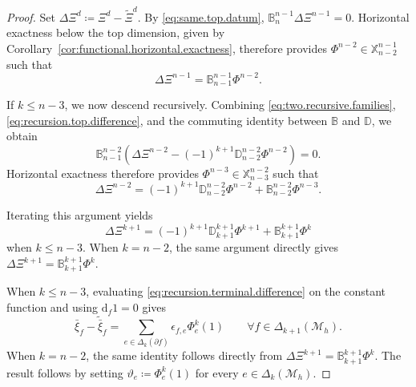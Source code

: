 \documentclass[a4paper,11pt]{article}
\theoremstyle{definition}
\newcommand{\DIFF}{\mathrm{d}}
\newcommand{\Mh}{\mathcal{M}_h}
\newcommand{\FM}[1]{\Delta_{#1}}
\begin{document}
\begin{proof}
Set $\Delta\Xi^d\coloneqq\Xi^d-\widetilde\Xi^d$.
By \eqref{eq:same.top.datum}, $\mathbb B_n^{n-1}\Delta\Xi^{n-1}=0$.
Horizontal exactness below the top dimension, given by Corollary~\ref{cor:functional.horizontal.exactness}, therefore provides $\Phi^{n-2} \in \mathbb X_{n-2}^{n-1}$ such that
\begin{equation}\label{eq:recursion.top.difference}
  \Delta\Xi^{n-1}
  =
  \mathbb B_{n-1}^{n-1}\Phi^{n-2}.
\end{equation}

If $k\leq n-3$, we now descend recursively.
Combining \eqref{eq:two.recursive.families}, \eqref{eq:recursion.top.difference}, and the commuting identity between $\mathbb B$ and $\mathbb D$, we obtain
\[
  \mathbb B_{n-1}^{n-2}
  \left(
    \Delta\Xi^{n-2}
    -
    (-1)^{k+1}
    \mathbb D_{n-2}^{n-2}\Phi^{n-2}
  \right)
  =
  0.
\]
Horizontal exactness therefore provides $\Phi^{n-3}\in\mathbb X_{n-3}^{n-2}$ such that
\[
  \Delta\Xi^{n-2}
  =
  (-1)^{k+1}\mathbb D_{n-2}^{n-2}\Phi^{n-2}
  +
  \mathbb B_{n-2}^{n-2}\Phi^{n-3}.
\]

Iterating this argument yields
\begin{equation}\label{eq:recursion.terminal.difference}
  \Delta\Xi^{k+1}
  =
  (-1)^{k+1}
  \mathbb D_{k+1}^{k+1}\Phi^{k+1}
  +
  \mathbb B_{k+1}^{k+1}\Phi^k
\end{equation}
when $k\leq n-3$.
When $k=n-2$, the same argument directly gives $\Delta\Xi^{k+1}=\mathbb B_{k+1}^{k+1}\Phi^k$.

When $k\leq n-3$, evaluating \eqref{eq:recursion.terminal.difference} on the constant function and using $\DIFF_f1=0$ gives
\[
  \bar\xi_f-\widetilde{\bar\xi}_f
  =
  \sum_{e\in\FM{k}(\partial f)}
  \epsilon_{f,e}\Phi_e^k(1)
  \qquad
  \forall f\in\FM{k+1}(\Mh).
\]
When $k=n-2$, the same identity follows directly from $\Delta\Xi^{k+1}=\mathbb B_{k+1}^{k+1}\Phi^k$.
The result follows by setting $\vartheta_e\coloneqq\Phi_e^k(1)$ for every $e\in\FM{k}(\Mh)$.
\end{proof}
\end{document}

